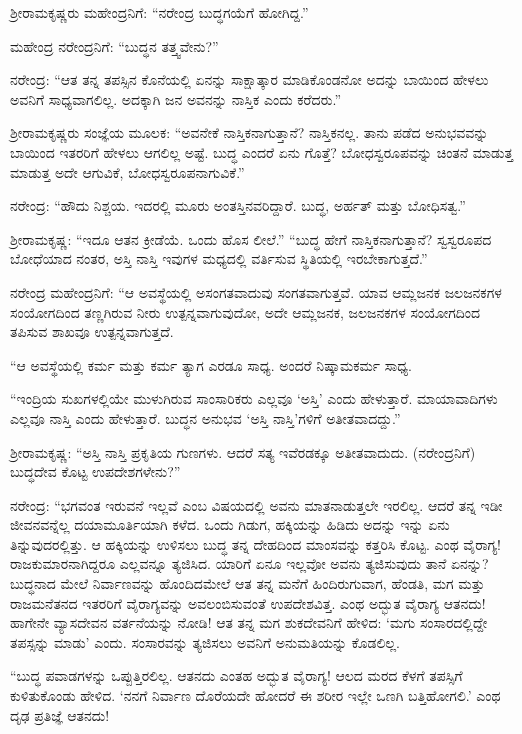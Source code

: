 ಶ‍್ರೀರಾಮಕೃಷ್ಣರು ಮಹೇಂದ್ರನಿಗೆ: “ನರೇಂದ್ರ ಬುದ್ಧಗಯೆಗೆ ಹೋಗಿದ್ದ.”

ಮಹೇಂದ್ರ ನರೇಂದ್ರನಿಗೆ: “ಬುದ್ಧನ ತತ್ತ್ವವೇನು?”

ನರೇಂದ್ರ: “ಆತ ತನ್ನ ತಪಸ್ಸಿನ ಕೊನೆಯಲ್ಲಿ ಏನನ್ನು ಸಾಕ್ಷಾತ್ಕಾರ ಮಾಡಿಕೊಂಡನೋ ಅದನ್ನು ಬಾಯಿಂದ ಹೇಳಲು ಅವನಿಗೆ ಸಾಧ್ಯವಾಗಲಿಲ್ಲ. ಅದಕ್ಕಾಗಿ ಜನ ಅವನನ್ನು ನಾಸ್ತಿಕ ಎಂದು ಕರೆದರು.”

ಶ‍್ರೀರಾಮಕೃಷ್ಣರು ಸಂಜ್ಞೆಯ ಮೂಲಕ: “ಅವನೇಕೆ ನಾಸ್ತಿಕನಾಗುತ್ತಾನೆ? ನಾಸ್ತಿಕನಲ್ಲ. ತಾನು ಪಡೆದ ಅನುಭವವನ್ನು ಬಾಯಿಂದ ಇತರರಿಗೆ ಹೇಳಲು ಆಗಲಿಲ್ಲ ಅಷ್ಟೆ. ಬುದ್ಧ ಎಂದರೆ ಏನು ಗೊತ್ತೆ? ಬೋಧಸ್ವರೂಪವನ್ನು ಚಿಂತನೆ ಮಾಡುತ್ತ ಮಾಡುತ್ತ ಅದೇ ಆಗುವಿಕೆ, ಬೋಧಸ್ವರೂಪನಾಗುವಿಕೆ.”

ನರೇಂದ್ರ: “ಹೌದು ನಿಶ್ಚಯ. ಇದರಲ್ಲಿ ಮೂರು ಅಂತಸ್ತಿನವರಿದ್ದಾರೆ. ಬುದ್ಧ, ಅರ್ಹತ್ ಮತ್ತು ಬೋಧಿಸತ್ವ.”

ಶ‍್ರೀರಾಮಕೃಷ್ಣ: “ಇದೂ ಆತನ ಕ್ರೀಡೆಯೆ. ಒಂದು ಹೊಸ ಲೀಲೆ.” “ಬುದ್ಧ ಹೇಗೆ ನಾಸ್ತಿಕನಾಗುತ್ತಾನೆ? ಸ್ವಸ್ವರೂಪದ ಬೋಧೆಯಾದ ನಂತರ, ಅಸ್ತಿ ನಾಸ್ತಿ ಇವುಗಳ ಮಧ್ಯದಲ್ಲಿ ವರ್ತಿಸುವ ಸ್ಥಿತಿಯಲ್ಲಿ ಇರಬೇಕಾಗುತ್ತದೆ.”

ನರೇಂದ್ರ ಮಹೇಂದ್ರನಿಗೆ: “ಆ ಅವಸ್ಥೆಯಲ್ಲಿ ಅಸಂಗತವಾದುವು ಸಂಗತವಾಗುತ್ತವೆ. ಯಾವ ಆಮ್ಲಜನಕ ಜಲಜನಕಗಳ ಸಂಯೋಗದಿಂದ ತಣ್ಣಗಿರುವ ನೀರು ಉತ್ಪನ್ನವಾಗುವುದೋ, ಅದೇ ಆಮ್ಲಜನಕ, ಜಲಜನಕಗಳ ಸಂಯೋಗದಿಂದ ತಪಿಸುವ ಶಾಖವೂ ಉತ್ಪನ್ನವಾಗುತ್ತದೆ.

“ಆ ಅವಸ್ಥೆಯಲ್ಲಿ ಕರ್ಮ ಮತ್ತು ಕರ್ಮ ತ್ಯಾಗ ಎರಡೂ ಸಾಧ್ಯ. ಅಂದರೆ ನಿಷ್ಕಾಮಕರ್ಮ ಸಾಧ್ಯ.

“ಇಂದ್ರಿಯ ಸುಖಗಳಲ್ಲಿಯೇ ಮುಳುಗಿರುವ ಸಾಂಸಾರಿಕರು ಎಲ್ಲವೂ ‘ಅಸ್ತಿ’ ಎಂದು ಹೇಳುತ್ತಾರೆ. ಮಾಯಾವಾದಿಗಳು ಎಲ್ಲವೂ ನಾಸ್ತಿ ಎಂದು ಹೇಳುತ್ತಾರೆ. ಬುದ್ಧನ ಅನುಭವ ‘ಅಸ್ತಿ ನಾಸ್ತಿ’ಗಳಿಗೆ ಅತೀತವಾದದ್ದು.”

ಶ‍್ರೀರಾಮಕೃಷ್ಣ: “ಅಸ್ತಿ ನಾಸ್ತಿ ಪ್ರಕೃತಿಯ ಗುಣಗಳು. ಆದರೆ ಸತ್ಯ ಇವೆರಡಕ್ಕೂ ಅತೀತವಾದುದು. (ನರೇಂದ್ರನಿಗೆ) ಬುದ್ಧದೇವ ಕೊಟ್ಟ ಉಪದೇಶಗಳೇನು?”

ನರೇಂದ್ರ: “ಭಗವಂತ ಇರುವನೆ ಇಲ್ಲವೆ ಎಂಬ ವಿಷಯದಲ್ಲಿ ಅವನು ಮಾತನಾಡುತ್ತಲೇ ಇರಲಿಲ್ಲ. ಆದರೆ ತನ್ನ ಇಡೀ ಜೀವನವನ್ನೆಲ್ಲ ದಯಾಮೂರ್ತಿಯಾಗಿ ಕಳೆದ. ಒಂದು ಗಿಡುಗ, ಹಕ್ಕಿಯನ್ನು ಹಿಡಿದು ಅದನ್ನು ಇನ್ನು ಏನು ತಿನ್ನುವುದರಲ್ಲಿತ್ತು. ಆ ಹಕ್ಕಿಯನ್ನು ಉಳಿಸಲು ಬುದ್ಧ ತನ್ನ ದೇಹದಿಂದ ಮಾಂಸವನ್ನು ಕತ್ತರಿಸಿ ಕೊಟ್ಟ. ಎಂಥ ವೈರಾಗ್ಯ! ರಾಜಕುಮಾರನಾಗಿದ್ದರೂ ಎಲ್ಲವನ್ನೂ ತ್ಯಜಿಸಿದ. ಯಾರಿಗೆ ಏನೂ ಇಲ್ಲವೋ ಅವನು ತ್ಯಜಿಸುವುದು ತಾನೆ ಏನನ್ನು? ಬುದ್ಧನಾದ ಮೇಲೆ ನಿರ್ವಾಣವನ್ನು ಹೊಂದಿದಮೇಲೆ ಆತ ತನ್ನ ಮನೆಗೆ ಹಿಂದಿರುಗುವಾಗ, ಹೆಂಡತಿ, ಮಗ ಮತ್ತು ರಾಜಮನೆತನದ ಇತರರಿಗೆ ವೈರಾಗ್ಯವನ್ನು ಅವಲಂಬಿಸುವಂತೆ ಉಪದೇಶವಿತ್ತ. ಎಂಥ ಅದ್ಭುತ ವೈರಾಗ್ಯ ಆತನದು! ಹಾಗೇನೇ ವ್ಯಾಸದೇವನ ವರ್ತನೆಯನ್ನು ನೋಡಿ! ಆತ ತನ್ನ ಮಗ ಶುಕದೇವನಿಗೆ ಹೇಳಿದ: ‘ಮಗು ಸಂಸಾರದಲ್ಲಿದ್ದೇ ತಪಸ್ಸನ್ನು ಮಾಡು’ ಎಂದು. ಸಂಸಾರವನ್ನು ತ್ಯಜಿಸಲು ಅವನಿಗೆ ಅನುಮತಿಯನ್ನು ಕೊಡಲಿಲ್ಲ.

“ಬುದ್ಧ ಪವಾಡಗಳನ್ನು ಒಪ್ಪುತ್ತಿರಲಿಲ್ಲ. ಆತನದು ಎಂತಹ ಅದ್ಭುತ ವೈರಾಗ್ಯ! ಆಲದ ಮರದ ಕೆಳಗೆ ತಪಸ್ಸಿಗೆ ಕುಳಿತುಕೊಂಡು ಹೇಳಿದ. ‘ನನಗೆ ನಿರ್ವಾಣ ದೊರೆಯದೇ ಹೋದರೆ ಈ ಶರೀರ ಇಲ್ಲೇ ಒಣಗಿ ಬತ್ತಿಹೋಗಲಿ.’ ಎಂಥ ದೃಢ ಪ್ರತಿಜ್ಞೆ ಆತನದು!

